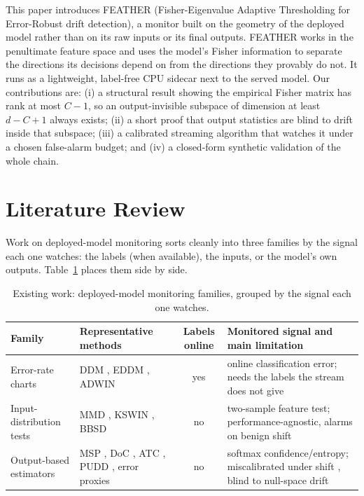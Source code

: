 \documentclass[sigconf,anonymous]{acmart}
\begin{document}
This paper introduces FEATHER (Fisher-Eigenvalue Adaptive Thresholding for
Error-Robust drift detection), a monitor built on the geometry of the
deployed model rather than on its raw inputs or its final outputs. FEATHER
works in the penultimate feature space and uses the model's Fisher
information to separate the directions its decisions depend on from the
directions they provably do not. It runs as a lightweight, label-free CPU
sidecar next to the served model. Our contributions are: (i) a structural
result showing the empirical Fisher matrix has rank at most $C-1$, so an
output-invisible subspace of dimension at least $d-C+1$ always exists;
(ii) a short proof that output statistics are blind to drift inside that
subspace; (iii) a calibrated streaming algorithm that watches it under a
chosen false-alarm budget; and (iv) a closed-form synthetic validation of
the whole chain.

\section{Literature Review}
\label{sec:survey}

Work on deployed-model monitoring sorts cleanly into three families by the
signal each one watches: the labels (when available), the inputs, or the
model's own outputs. Table~\ref{tab:families} places them side by side.

\begin{table}[t]
\caption{Existing work: deployed-model monitoring families, grouped by the
signal each one watches.}
\label{tab:families}
\small
\begin{tabularx}{\textwidth}{@{}p{2.9cm} p{4.6cm} c X@{}}
\toprule
Family & Representative methods & Labels online & Monitored signal and main limitation \\
\midrule
Error-rate charts & DDM \cite{gama2004learning}, EDDM \cite{baena2006eddm}, ADWIN \cite{bifet2007adwin} & yes & online classification error; needs the labels the stream does not give \\
Input-distribution tests & MMD \cite{gretton2012kernel}, KSWIN \cite{raab2020kswin}, BBSD \cite{rabanser2019failing} & no & two-sample feature test; performance-agnostic, alarms on benign shift \\
Output-based estimators & MSP \cite{hendrycks2017baseline}, DoC \cite{guillory2021doc}, ATC \cite{garg2022atc}, PUDD \cite{pudd2025}, error proxies \cite{amoukou2024sequential} & no & softmax confidence/entropy; miscalibrated under shift \cite{ovadia2019trust}, blind to null-space drift \\
\bottomrule
\end{tabularx}
\end{table}
\end{document}
